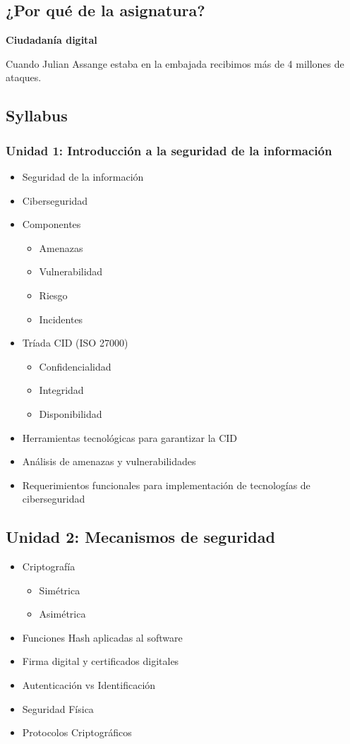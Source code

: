 \documentclass[12pt,a4paper]{article}
\begin{document}
\subsection{¿Por qué de la asignatura?}
\textbf{Ciudadanía digital}

Cuando Julian Assange estaba en la embajada recibimos más de 4 millones de ataques.

\subsection{Syllabus}
\subsubsection{Unidad 1: Introducción a la seguridad de la información}
\begin{itemize}
    \item Seguridad de la información
    \item Ciberseguridad
    \item Componentes
    \begin{itemize}
        \item Amenazas
        \item Vulnerabilidad
        \item Riesgo
        \item Incidentes
    \end{itemize}
    \item Tríada CID (ISO 27000)
    \begin{itemize}
        \item Confidencialidad
        \item Integridad
        \item Disponibilidad
    \end{itemize}
    \item Herramientas tecnológicas para garantizar la CID
    \item Análisis de amenazas y vulnerabilidades
    \item Requerimientos funcionales para implementación de tecnologías de ciberseguridad
\end{itemize}

\subsection{Unidad 2: Mecanismos de seguridad}
\begin{itemize}
    \item Criptografía
    \begin{itemize}
        \item Simétrica
        \item Asimétrica
    \end{itemize}
    \item Funciones Hash aplicadas al software
    \item Firma digital y certificados digitales
    \item Autenticación vs Identificación
    \item Seguridad Física
    \item Protocolos Criptográficos
\end{itemize}
\end{document}

